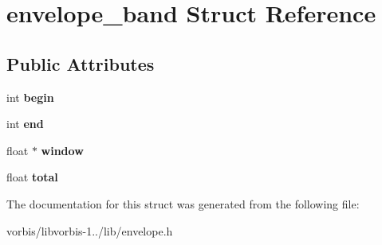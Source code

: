 \hypertarget{structenvelope__band}{\section{envelope\+\_\+band Struct Reference}
\label{structenvelope__band}
}
\subsection*{Public Attributes}
\begin{DoxyCompactItemize}
\item 
\hypertarget{structenvelope__band_ae0ebaa120b782f4b798de3c445ac634b}{int {\bfseries begin}}\label{structenvelope__band_ae0ebaa120b782f4b798de3c445ac634b}

\item 
\hypertarget{structenvelope__band_abf849c2990c227fc1d1667685c370bc2}{int {\bfseries end}}\label{structenvelope__band_abf849c2990c227fc1d1667685c370bc2}

\item 
\hypertarget{structenvelope__band_ae5ee62ee2b75d2ecfac29d8a5f554287}{float $\ast$ {\bfseries window}}\label{structenvelope__band_ae5ee62ee2b75d2ecfac29d8a5f554287}

\item 
\hypertarget{structenvelope__band_a3f562ee35b24e837e858ddef98cbf5f7}{float {\bfseries total}}\label{structenvelope__band_a3f562ee35b24e837e858ddef98cbf5f7}

\end{DoxyCompactItemize}


The documentation for this struct was generated from the following file\+:\begin{DoxyCompactItemize}
\item 
vorbis/libvorbis-\/1../lib/envelope.\+h\end{DoxyCompactItemize}
